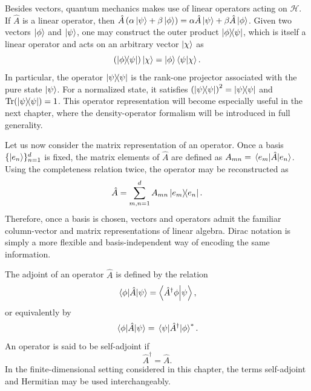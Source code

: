 Besides vectors, quantum mechanics makes use of linear operators acting on $\mathcal{H}$. If $\hat A$ is a linear operator, then $\hat A\left(\alpha\ket{\psi}+\beta\ket{\phi}\right)=\alpha\hat A\ket{\psi}+\beta\hat A\ket{\phi}$. Given two vectors $\ket{\phi}$ and $\ket{\psi}$, one may construct the outer product $\dyad{\phi}{\psi}$, which is itself a linear operator and acts on an arbitrary vector $\ket{\chi}$ as
\begin{equation}
	\left(\dyad{\phi}{\psi}\right)\ket{\chi}
	=
	\ket{\phi}\braket{\psi}{\chi}.
	\label{eq:intro_qm_outer_product_action}
\end{equation}
In particular, the operator $\dyad{\psi}{\psi}$ is the rank-one projector associated with the pure state $\ket{\psi}$. For a normalized state, it satisfies $\left(\dyad{\psi}{\psi}\right)^2=\dyad{\psi}{\psi}$ and $\Tr\!\left(\dyad{\psi}{\psi}\right)=1$. This operator representation will become especially useful in the next chapter, where the density-operator formalism will be introduced in full generality.

Let us now consider the matrix representation of an operator. Once a basis $\{\ket{e_n}\}_{n=1}^d$ is fixed, the matrix elements of $\hat A$ are defined as $A_{mn}=\matrixel{e_m}{\hat A}{e_n}$. Using the completeness relation twice, the operator may be reconstructed as
\begin{equation}
	\hat A
	=
	\sum_{m,n=1}^{d}
	A_{mn}\dyad{e_m}{e_n}.
	\label{eq:intro_qm_operator_reconstruction_matrix_elements}
\end{equation}
Therefore, once a basis is chosen, vectors and operators admit the familiar column-vector and matrix representations of linear algebra. Dirac notation is simply a more flexible and basis-independent way of encoding the same information.

The adjoint of an operator $\hat A$ is defined by the relation
\begin{equation}
	\matrixel{\phi}{\hat A}{\psi}
	=
	\braket{\hat A^\dagger\phi}{\psi},
	\label{eq:intro_qm_adjoint_definition}
\end{equation}
or equivalently by
\begin{equation}
	\matrixel{\phi}{\hat A}{\psi}
	=
	\matrixel{\psi}{\hat A^\dagger}{\phi}^*.
	\label{eq:intro_qm_adjoint_matrix_element_relation}
\end{equation}
An operator is said to be self-adjoint if
\begin{equation}
	\hat A^\dagger=\hat A.
	\label{eq:intro_qm_selfadjoint_definition}
\end{equation}
In the finite-dimensional setting considered in this chapter, the terms self-adjoint and Hermitian may be used interchangeably.


